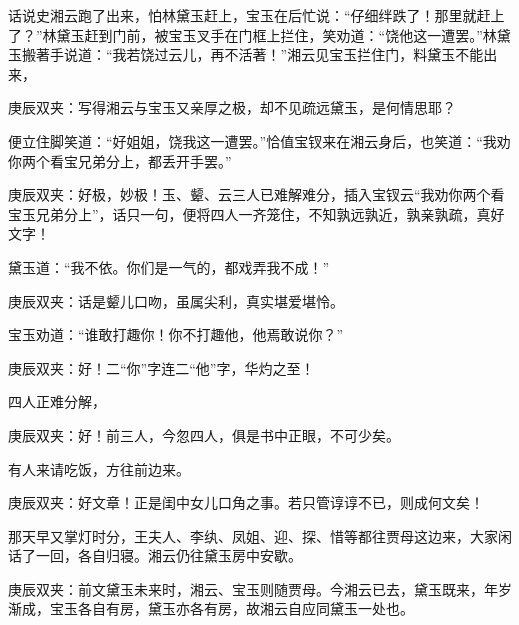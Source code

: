 \begin{parag}
    话说史湘云跑了出来，怕林黛玉赶上，宝玉在后忙说：“仔细绊跌了！那里就赶上了？”林黛玉赶到门前，被宝玉叉手在门框上拦住，笑劝道：“饶他这一遭罢。”林黛玉搬著手说道：“我若饶过云儿，再不活著！”湘云见宝玉拦住门，料黛玉不能出来，\begin{note}庚辰双夹：写得湘云与宝玉又亲厚之极，却不见疏远黛玉，是何情思耶？\end{note}便立住脚笑道：“好姐姐，饶我这一遭罢。”恰值宝钗来在湘云身后，也笑道：“我劝你两个看宝兄弟分上，都丢开手罢。”\begin{note}庚辰双夹：好极，妙极！玉、颦、云三人已难解难分，插入宝钗云“我劝你两个看宝玉兄弟分上”，话只一句，便将四人一齐笼住，不知孰远孰近，孰亲孰疏，真好文字！\end{note}黛玉道：“我不依。你们是一气的，都戏弄我不成！”\begin{note}庚辰双夹：话是颦儿口吻，虽属尖利，真实堪爱堪怜。\end{note}宝玉劝道：“谁敢打趣你！你不打趣他，他焉敢说你？”\begin{note}庚辰双夹：好！二“你”字连二“他”字，华灼之至！\end{note}四人正难分解，\begin{note}庚辰双夹：好！前三人，今忽四人，俱是书中正眼，不可少矣。\end{note}有人来请吃饭，方往前边来。\begin{note}庚辰双夹：好文章！正是闺中女儿口角之事。若只管谆谆不已，则成何文矣！\end{note}
\end{parag}


\begin{parag}
    那天早又掌灯时分，王夫人、李纨、凤姐、迎、探、惜等都往贾母这边来，大家闲话了一回，各自归寝。湘云仍往黛玉房中安歇。\begin{note}庚辰双夹：前文黛玉未来时，湘云、宝玉则随贾母。今湘云已去，黛玉既来，年岁渐成，宝玉各自有房，黛玉亦各有房，故湘云自应同黛玉一处也。\end{note}
\end{parag}



